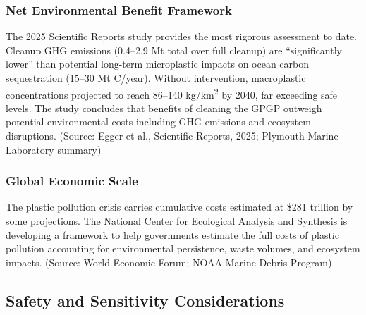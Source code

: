 \documentclass[11pt,letterpaper]{article}
\begin{document}
\subsubsection{Net Environmental Benefit Framework}
The 2025 Scientific Reports study provides the most rigorous assessment to date. Cleanup GHG emissions (0.4--2.9 Mt total over full cleanup) are ``significantly lower'' than potential long-term microplastic impacts on ocean carbon sequestration (15--30 Mt C/year). Without intervention, macroplastic concentrations projected to reach 86--140 kg/km\textsuperscript{2} by 2040, far exceeding safe levels. The study concludes that benefits of cleaning the GPGP outweigh potential environmental costs including GHG emissions and ecosystem disruptions. (Source: Egger et al., Scientific Reports, 2025; Plymouth Marine Laboratory summary)

\subsubsection{Global Economic Scale}
The plastic pollution crisis carries cumulative costs estimated at \$281 trillion by some projections. The National Center for Ecological Analysis and Synthesis is developing a framework to help governments estimate the full costs of plastic pollution accounting for environmental persistence, waste volumes, and ecosystem impacts. (Source: World Economic Forum; NOAA Marine Debris Program)

\subsection{Safety and Sensitivity Considerations}
\end{document}

